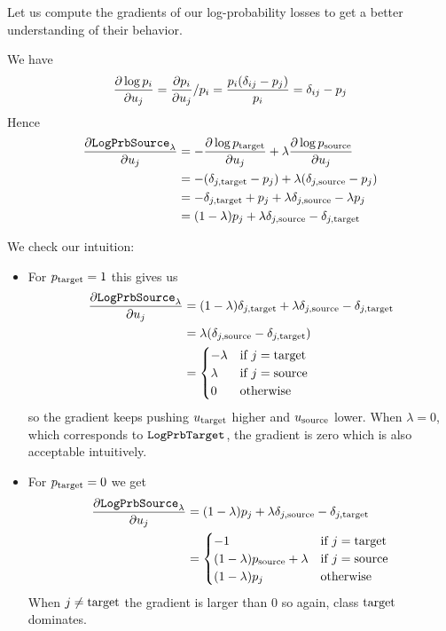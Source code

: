\documentclass[../main.tex]{subfiles}
\begin{document}
Let us compute the gradients of our log-probability losses to get a better understanding of their behavior.

We have
\begin{align*}
    \frac{\partial \log p_i}{\partial u_j}
= \frac{\partial p_i}{\partial u_j} / p_i
= \frac{p_i (\delta_{ij} - p_j) }{p_i}
= \delta_{ij} - p_j
\end{align*}
Hence
\begin{align*}
    \frac{\partial \mathtt{LogPrbSource}_{\lambda}}{\partial u_j}
     & = - \frac{\partial \log p_{\mathrm{target}}}{\partial u_j} + \lambda \frac{\partial \log p_{\mathrm{source}}}{\partial u_j} \\
     & = - (\delta_{j, \mathrm{target}} - p_j) + \lambda (\delta_{j, \mathrm{source}} - p_j)                             \\
     & = - \delta_{j, \mathrm{target}} + p_j + \lambda \delta_{j, \mathrm{source}} - \lambda p_j                         \\
     & = (1 - \lambda) p_j + \lambda \delta_{j, \mathrm{source}} - \delta_{j, \mathrm{target}}
\end{align*}

We check our intuition:
\begin{itemize}
    \item For $p_{\mathrm{target}} = 1$ this gives us
          \begin{align*}
              \frac{\partial \mathtt{LogPrbSource}_{\lambda}}{\partial u_j}
               & = (1 - \lambda) \delta_{j, \mathrm{target}} + \lambda \delta_{j, \mathrm{source}} - \delta_{j, \mathrm{target}} \\
               & = \lambda(\delta_{j, \mathrm{source}} - \delta_{j, \mathrm{target}})                     \\
               & = \begin{cases}
                       -\lambda & \text{if } j = \mathrm{target} \\
                       \lambda  & \text{if } j = \mathrm{source} \\
                       0        & \text{otherwise}
                   \end{cases}
          \end{align*}
so the gradient keeps pushing $u_{\mathrm{target}}$ higher and $u_{\mathrm{source}}$ lower.
          When $\lambda = 0$, which corresponds to $\mathtt{LogPrbTarget}$, the gradient is zero which is also acceptable intuitively.

    \item For $p_{\mathrm{target}} = 0$ we get
          \begin{align*}
              \frac{\partial \mathtt{LogPrbSource}_{\lambda}}{\partial u_j}
               & = (1 - \lambda) p_j + \lambda \delta_{j, \mathrm{source}} - \delta_{j, \mathrm{target}}                 \\
               & = \begin{cases}
-1                 & \text{if } j = \mathrm{target} \\
                       (1-\lambda)p_{\mathrm{source}} + \lambda & \text{if } j = \mathrm{source} \\
                       (1 - \lambda) p_j              & \text{otherwise}
                   \end{cases}
          \end{align*}
When $j \neq \mathrm{target}$ the gradient is larger than 0 so again, class $\mathrm{target}$ dominates.
\end{itemize}
\end{document}
